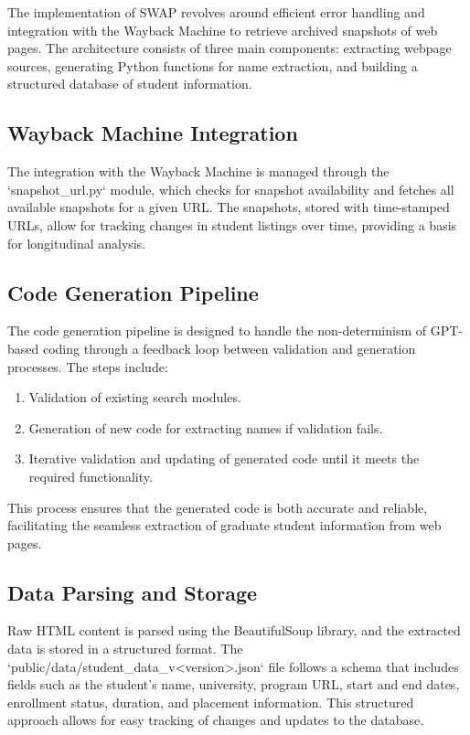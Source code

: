\documentclass[11pt]{article}
\begin{document}
The implementation of SWAP revolves around efficient error handling and integration with the Wayback Machine to retrieve archived snapshots of web pages. The architecture consists of three main components: extracting webpage sources, generating Python functions for name extraction, and building a structured database of student information.

\subsection{Wayback Machine Integration}

The integration with the Wayback Machine is managed through the `snapshot_url.py` module, which checks for snapshot availability and fetches all available snapshots for a given URL. The snapshots, stored with time-stamped URLs, allow for tracking changes in student listings over time, providing a basis for longitudinal analysis.

\subsection{Code Generation Pipeline}

The code generation pipeline is designed to handle the non-determinism of GPT-based coding through a feedback loop between validation and generation processes. The steps include:
\begin{enumerate}
    \item Validation of existing search modules.
    \item Generation of new code for extracting names if validation fails.
    \item Iterative validation and updating of generated code until it meets the required functionality.
\end{enumerate}

This process ensures that the generated code is both accurate and reliable, facilitating the seamless extraction of graduate student information from web pages.

\subsection{Data Parsing and Storage}

Raw HTML content is parsed using the BeautifulSoup library, and the extracted data is stored in a structured format.
The `public/data/student_data_v<version>.json` file follows a schema that includes fields such as the student's name, university, program URL, start and end dates, enrollment status, duration, and placement information. This structured approach allows for easy tracking of changes and updates to the database.
\end{document}
